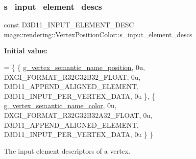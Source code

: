 \subsubsection{\texorpdfstring{s\+\_\+input\+\_\+element\+\_\+descs}{s\_input\_element\_descs}}
{\footnotesize\ttfamily const D3\+D11\+\_\+\+I\+N\+P\+U\+T\+\_\+\+E\+L\+E\+M\+E\+N\+T\+\_\+\+D\+E\+SC mage\+::rendering\+::\+Vertex\+Position\+Color\+::s\+\_\+input\+\_\+element\+\_\+descs\hspace{0.3cm}{\ttfamily [static]}}

{\bfseries Initial value\+:}
\begin{DoxyCode}
= \{
        \{ \mbox{\hyperlink{namespacemage_1_1rendering_1_1anonymous__namespace_02vertex_8cpp_03_a6e875b92e4de38b14e8dc404df41a5ad}{g\_vertex\_semantic\_name\_position}}, 0u, DXGI\_FORMAT\_R32G32B32\_FLOAT, 
         0u, D3D11\_APPEND\_ALIGNED\_ELEMENT, D3D11\_INPUT\_PER\_VERTEX\_DATA, 0u \},
        \{ \mbox{\hyperlink{namespacemage_1_1rendering_1_1anonymous__namespace_02vertex_8cpp_03_aae8cd813faec1e62d4e6463db8c99ab5}{g\_vertex\_semantic\_name\_color}},    0u, DXGI\_FORMAT\_R32G32B32A32\_FLOAT, 
      0u, D3D11\_APPEND\_ALIGNED\_ELEMENT, D3D11\_INPUT\_PER\_VERTEX\_DATA, 0u \}
    \}
\end{DoxyCode}
The input element descriptors of a vertex. 